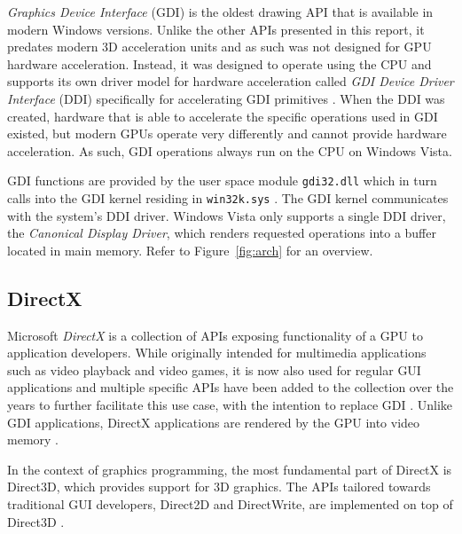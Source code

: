 		 \label{sec:gdi}
			\textit{Graphics Device Interface} (GDI) is the oldest drawing API
			that is available in modern Windows versions. Unlike the other
			APIs presented in this report,
			it predates modern 3D acceleration units and as such
			was not designed for GPU hardware acceleration. Instead, it was
			designed to operate using the CPU and supports its own driver model
			for hardware acceleration called \textit{GDI Device Driver
			Interface} (DDI) specifically for accelerating GDI
			primitives \cite{d2dvsgdi}. When the DDI was created, hardware that is able to
			accelerate the specific operations used in GDI existed, but modern GPUs operate
			very differently and cannot provide hardware acceleration. As such,
			GDI operations always run on the CPU on Windows Vista. \cite{d2dvsgdi}

			GDI functions are provided by the user space module
			\texttt{gdi32.dll} which in turn calls into the GDI kernel residing
			in \texttt{win32k.sys} \cite{d2dvsgdi}. The GDI kernel communicates with the
			system's DDI driver. Windows Vista only supports a single DDI driver,
			the \textit{Canonical Display Driver}, which renders requested operations
			into a buffer located in main memory. Refer to Figure~\ref{fig:arch}
			for an overview. \cite{d2dvsgdi, dwmredirect}

		\subsection{DirectX}
			Microsoft \textit{DirectX} is a collection of APIs exposing functionality of
			a GPU to application developers. While originally intended for
			multimedia applications such as video playback and video games, it
			is now also used for regular GUI applications and multiple specific
			APIs have been added to the collection over the years to further
			facilitate this use case, with the intention to replace GDI \cite{aboutd2d}.
			Unlike GDI applications, DirectX applications
			are rendered by the GPU into video memory \cite{d2dvsgdi}.

			In the context of graphics programming, the most fundamental part of
			DirectX is Direct3D, which provides support for 3D graphics. The
			APIs tailored towards traditional GUI developers, Direct2D and
			DirectWrite, are implemented on top of Direct3D \cite{aboutd2d}.

